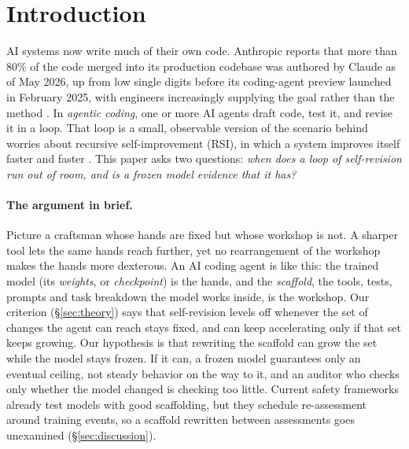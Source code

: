 \documentclass{article}
\theoremstyle{remark}
\theoremstyle{plain}
\begin{document}
\section{Introduction}
\label{sec:intro}

AI systems now write much of their own code. Anthropic reports that more than 80\% of the code merged into its production codebase was authored by Claude as of May 2026, up from low single digits before its coding-agent preview launched in February 2025, with engineers increasingly supplying the goal rather than the method \citep{anthropic2026aibuildsitself}. In \emph{agentic coding}, one or more AI agents draft code, test it, and revise it in a loop. That loop is a small, observable version of the scenario behind worries about recursive self-improvement (RSI), in which a system improves itself faster and faster \citep{good1965speculations, bostrom2014superintelligence}. This paper asks two questions: \emph{when does a loop of self-revision run out of room, and is a frozen model evidence that it has?}

\paragraph{The argument in brief.} Picture a craftsman whose hands are fixed but whose workshop is not. A sharper tool lets the same hands reach further, yet no rearrangement of the workshop makes the hands more dexterous. An AI coding agent is like this: the trained model (its \emph{weights}, or \emph{checkpoint}) is the hands, and the \emph{scaffold}, the tools, tests, prompts and task breakdown the model works inside, is the workshop. Our criterion (\S\ref{sec:theory}) says that self-revision levels off whenever the set of changes the agent can reach stays fixed, and can keep accelerating only if that set keeps growing. Our hypothesis is that rewriting the scaffold can grow the set while the model stays frozen. If it can, a frozen model guarantees only an eventual ceiling, not steady behavior on the way to it, and an auditor who checks only whether the model changed is checking too little. Current safety frameworks already test models with good scaffolding, but they schedule re-assessment around training events, so a scaffold rewritten between assessments goes unexamined (\S\ref{sec:discussion}).
\end{document}
